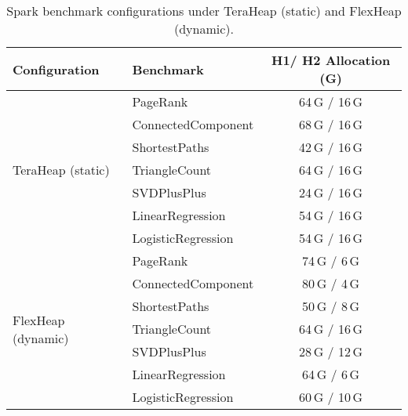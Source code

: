 \begin{table}[H]
\centering
\small
\renewcommand{\arraystretch}{1}
\caption{Spark benchmark configurations under TeraHeap (static) and FlexHeap (dynamic).}
\label{tab:spark-benchmark-configs}
\begin{tabular}{|l|l|c|}
\hline
\textbf{Configuration} & \textbf{Benchmark} & \textbf{H1/ H2 Allocation (G)} \\
\hline
\multirow{7}{*}{TeraHeap (static)} 
& PageRank             & 64\,G / 16\,G \\
& ConnectedComponent   & 68\,G / 16\,G \\
& ShortestPaths        & 42\,G / 16\,G \\
& TriangleCount        & 64\,G / 16\,G \\
& SVDPlusPlus          & 24\,G / 16\,G \\
& LinearRegression     & 54\,G / 16\,G \\
& LogisticRegression   & 54\,G / 16\,G \\
\hline
\multirow{7}{*}{FlexHeap (dynamic)} 
& PageRank             & 74\,G / 6\,G  \\
& ConnectedComponent   & 80\,G / 4\,G  \\
& ShortestPaths        & 50\,G / 8\,G \\
& TriangleCount        & 64\,G / 16\,G \\
& SVDPlusPlus          & 28\,G / 12\,G \\
& LinearRegression     & 64\,G / 6\,G  \\
& LogisticRegression   & 60\,G / 10\,G \\
\hline
\end{tabular}
\end{table}

%
%


